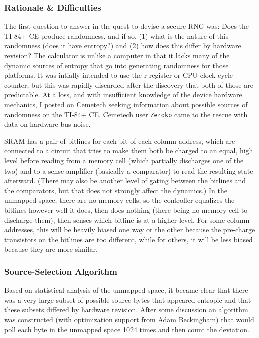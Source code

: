 \documentclass[titlepage]{report}
\begin{document}
	\subsubsection{Rationale \& Difficulties}
	The first question to answer in the quest to devise a secure RNG was: Does the TI-84+ CE produce randomness, and if so, (1) what is the nature of this randomness (does it have entropy?) and (2) how does this differ by hardware revision? The calculator is unlike a computer in that it lacks many of the dynamic sources of entropy that go into generating randomness for those platforms. It was intially intended to use the r register or CPU clock cycle counter, but this was rapidly discarded after the discovery that both of those are predictable. At a loss, and with insufficient knowledge of the device hardware mechanics, I posted on Cemetech seeking information about possible sources of randomness on the TI-84+ CE. Cemetech user \texttt{Zeroko} came to the rescue with data on hardware bus noise.
	\begin{newquote}
		SRAM has a pair of bitlines for each bit of each column address, which are connected to a circuit that tries to make them both be charged to an equal, high level before reading from a memory cell (which partially discharges one of the two) and to a sense amplifier (basically a comparator) to read the resulting state afterward. (There may also be another level of gating between the bitlines and the comparators, but that does not strongly affect the dynamics.) In the unmapped space, there are no memory cells, so the controller equalizes the bitlines however well it does, then does nothing (there being no memory cell to discharge them), then senses which bitline is at a higher level. For some column addresses, this will be heavily biased one way or the other because the pre-charge transistors on the bitlines are too different, while for others, it will be less biased because they are more similar.\footnotemark
	\end{newquote}
	\subsubsection{Source-Selection Algorithm}
	Based on statistical analysis of the unmapped space, it became clear that there was a very large subset of possible source bytes that appeared entropic and that these subsets differed by hardware revision. After some discussion an algorithm was constructed (with optimization support from Adam Beckingham) that would poll each byte in the unmapped space 1024 times and then count the deviation.
	
\end{document}

